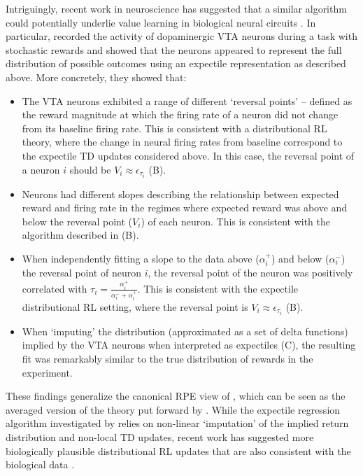 Intriguingly, recent work in neuroscience has suggested that a similar algorithm could potentially underlie value learning in biological neural circuits \citep{dabney2020distributional,lowet2020distributional}.
In particular, \citet{dabney2020distributional} recorded the activity of dopaminergic VTA neurons during a task with stochastic rewards and showed that the neurons appeared to represent the full distribution of possible outcomes using an expectile representation as described above.
More concretely, they showed that:
\begin{itemize}
    \item The VTA neurons exhibited a range of different `reversal points' -- defined as the reward magnitude at which the firing rate of a neuron did not change from its baseline firing rate.
    This is consistent with a distributional RL theory, where the change in neural firing rates from baseline correspond to the expectile TD updates considered above.
    In this case, the reversal point of a neuron $i$ should be $V_i \approx \epsilon_{\tau_i}$ (B).
    \item Neurons had different slopes describing the relationship between expected reward and firing rate in the regimes where expected reward was above and below the reversal point ($V_i$) of each neuron.
    This is consistent with the algorithm described in  (B).
    \item When independently fitting a slope to the data above ($\alpha_i^+$) and below ($\alpha_i^-$) the reversal point of neuron $i$, the reversal point of the neuron was positively correlated with $\tau_i = \frac{\alpha_i^{+}}{\alpha_i^- + \alpha_i^+}$.
    This is consistent with the expectile distributional RL setting, where the reversal point is $V_i \approx \epsilon_{\tau_i}$ (B).
    \item When `imputing' the distribution (approximated as a set of delta functions) implied by the VTA neurons when interpreted as expectiles (C), the resulting fit was remarkably similar to the true distribution of rewards in the experiment.
\end{itemize}
These findings generalize the canonical RPE view of \citet{schultz1997neural}, which can be seen as the averaged version of the theory put forward by \citet{dabney2020distributional}.
While the expectile regression algorithm investigated by \citet{dabney2020distributional} relies on non-linear `imputation' of the implied return distribution and non-local TD updates, recent work has suggested more biologically plausible distributional RL updates that are also consistent with the biological data \citep{tano2020local}.
